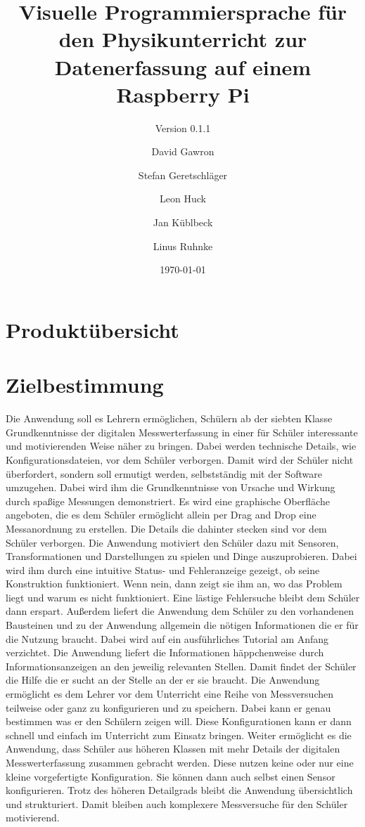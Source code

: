 \documentclass[parskip=full]{scrartcl}
\title{Visuelle Programmiersprache für den Physikunterricht zur Datenerfassung auf einem Raspberry Pi}
\subtitle{Version 0.1.1}
\author{David Gawron \and Stefan Geretschläger \and Leon Huck \and Jan Küblbeck \and Linus Ruhnke}
\date{\today}
\begin{document}
\maketitle

\newpage

\tableofcontents 					%

\section{Produktübersicht}



\section{Zielbestimmung}

Die Anwendung soll es Lehrern ermöglichen, Schülern ab der siebten Klasse Grundkenntnisse der digitalen Messwerterfassung in einer für Schüler interessante und motivierenden Weise näher zu bringen. Dabei werden technische Details, wie Konfigurationsdateien, vor dem Schüler verborgen. Damit wird der Schüler nicht überfordert, sondern soll ermutigt werden, selbstständig mit der Software umzugehen. Dabei wird ihm die Grundkenntnisse von Ursache und Wirkung durch spaßige Messungen demonstriert.
\newline 
Es wird eine graphische Oberfläche angeboten, die es dem Schüler ermöglicht allein per Drag and Drop eine Messanordnung zu erstellen. Die Details die dahinter stecken sind vor dem Schüler verborgen. Die Anwendung motiviert den Schüler dazu mit Sensoren, Transformationen und Darstellungen zu spielen und Dinge auszuprobieren. Dabei wird ihm durch eine intuitive Status- und Fehleranzeige gezeigt, ob seine Konstruktion funktioniert. Wenn nein, dann zeigt sie ihm an, wo das Problem liegt und warum es nicht funktioniert. Eine lästige Fehlersuche bleibt dem Schüler dann erspart.
\newline
 Außerdem liefert die Anwendung dem Schüler zu den vorhandenen Bausteinen und zu der Anwendung allgemein die nötigen Informationen die er für die Nutzung braucht. Dabei wird auf ein ausführliches Tutorial am Anfang verzichtet. Die Anwendung liefert die Informationen häppchenweise durch Informationsanzeigen an den jeweilig relevanten Stellen. Damit findet der Schüler die Hilfe die er sucht an der Stelle an der er sie braucht. 
\newline
Die Anwendung ermöglicht es dem Lehrer vor dem Unterricht eine Reihe von Messversuchen teilweise oder ganz zu konfigurieren und zu speichern. Dabei kann er genau bestimmen was er den Schülern zeigen will. Diese Konfigurationen kann er dann schnell und einfach im Unterricht zum Einsatz bringen.
\newline  
Weiter ermöglicht es die Anwendung, dass Schüler aus höheren Klassen mit mehr Details der digitalen Messwerterfassung zusammen gebracht werden. Diese nutzen keine oder nur eine kleine vorgefertigte Konfiguration. Sie können dann auch selbst einen Sensor konfigurieren. Trotz des höheren Detailgrads bleibt die Anwendung übersichtlich und strukturiert. Damit bleiben auch komplexere Messversuche für den Schüler motivierend.
\newline
\end{document}
